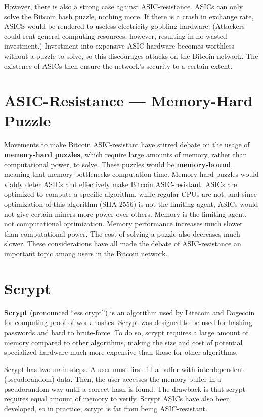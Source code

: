 \documentclass[11pt]{article}
\begin{document}
    However, there is also a strong case against ASIC-resistance. ASICs can only solve the Bitcoin hash puzzle, nothing more. If there is a crash in exchange rate, ASICS would be rendered to useless electricity-gobbling hardware. (Attackers could rent general computing resources, however, resulting in no wasted investment.) Investment into expensive ASIC hardware becomes worthless without a puzzle to solve, so this discourages attacks on the Bitcoin network. The existence of ASICs then ensure the network's security to a certain extent.
    
    \section*{ASIC-Resistance --- Memory-Hard Puzzle}
    
    Movements to make Bitcoin ASIC-resistant have stirred debate on the usage of \textbf{memory-hard puzzles}, which require large amounts of memory, rather than computational power, to solve. These puzzles would be \textbf{memory-bound}, meaning that memory bottlenecks computation time. Memory-hard puzzles would viably deter ASICs and effectively make Bitcoin ASIC-resistant. ASICs are optimized to compute a specific algorithm, while regular CPUs are not, and since optimization of this algorithm (SHA-2556) is not the limiting agent, ASICs would not give certain miners more power over others. Memory is the limiting agent, not computational optimization. Memory performance increases much slower than computational power. The cost of solving a puzzle also decreases much slower. These considerations have all made the debate of ASIC-resistance an important topic among users in the Bitcoin network.
    
    \section*{Scrypt}
    
    \textbf{Scrypt} (pronounced ``ess crypt'') is an algorithm used by Litecoin and Dogecoin for computing proof-of-work hashes. Scrypt was designed to be used for hashing passwords and hard to brute-force. To do so, scrypt requires a large amount of memory compared to other algorithms, making the size and cost of potential specialized hardware much more expensive than those for other algorithms. 
    
    Scrypt has two main steps. A user must first fill a buffer with interdependent (pseudorandom) data. Then, the user accesses the memory buffer in a pseudorandom way until a correct hash is found. The drawback is that scrypt requires equal amount of memory to verify. Scrypt ASICs have also been developed, so in practice, scrypt is far from being ASIC-resistant.
    
\end{document}
